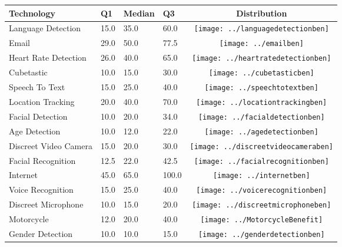 \begin{table}[t]
\begin{center}
\small
\begin{tabular}{| p{2cm} | p{1cm} | p{1cm} | p{1cm} | c |}
\hline
Technology & Q1 &  Median & Q3 & Distribution  \\ 
\hline
Language Detection  & 15.0 & 35.0 & 60.0 & \texttt{[image: ../languagedetectionben]} \\ 
Email  & 29.0 & 50.0 & 77.5 & \texttt{[image: ../emailben]} \\ 
Heart Rate Detection  & 26.0 & 40.0 & 65.0 & \texttt{[image: ../heartratedetectionben]} \\ 
Cubetastic  & 10.0 & 15.0 & 30.0 & \texttt{[image: ../cubetasticben]} \\ 
Speech To Text  & 15.0 & 25.0 & 40.0 & \texttt{[image: ../speechtotextben]} \\ 
Location Tracking  & 20.0 & 40.0 & 70.0 & \texttt{[image: ../locationtrackingben]} \\ 
Facial Detection  & 10.0 & 20.0 & 34.0 & \texttt{[image: ../facialdetectionben]} \\ 
Age Detection  & 10.0 & 12.0 & 22.0 & \texttt{[image: ../agedetectionben]} \\ 
Discreet Video Camera  & 15.0 & 20.0 & 30.0 & \texttt{[image: ../discreetvideocameraben]} \\ 
Facial Recognition  & 12.5 & 22.0 & 42.5 & \texttt{[image: ../facialrecognitionben]} \\ 
Internet  & 45.0 & 65.0 & 100.0 & \texttt{[image: ../internetben]} \\ 
Voice Recognition  & 15.0 & 25.0 & 40.0 & \texttt{[image: ../voicerecognitionben]} \\ 
Discreet Microphone  & 10.0 & 15.0 & 20.0 & \texttt{[image: ../discreetmicrophoneben]} \\ 
Motorcycle & 12.0 & 20.0 & 40.0 & \texttt{[image: ../MotorcycleBenefit]} \\ 
Gender Detection  & 10.0 & 10.0 & 15.0 & \texttt{[image: ../genderdetectionben]} \\ 

\end{tabular}
\end{center}
\end{table}
